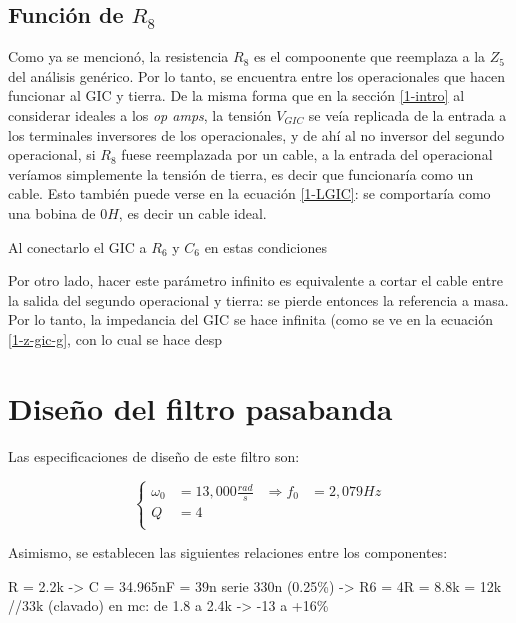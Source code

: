 \documentclass[../../tc_tp3_main.tex]{subfiles}
\begin{document}
\subsection{Funci\'on de $R_8$}

Como ya se mencion\'o, la resistencia $R_8$ es el compoonente que reemplaza a la $Z_5$ del an\'alisis gen\'erico. Por lo tanto, se encuentra entre los operacionales que hacen funcionar al GIC y tierra. De la misma forma que en la secci\'on \ref{1-intro} al considerar ideales a los \textit{op amps}, la tensi\'on $V_{GIC}$ se ve\'ia replicada de la entrada a los terminales inversores de los operacionales, y de ah\'i al no inversor del segundo operacional, si $R_8$ fuese reemplazada por un cable, a la entrada del operacional ver\'iamos simplemente la tensi\'on de tierra, es decir que funcionar\'ia como un cable. Esto tambi\'en puede verse en la ecuaci\'on \ref{1-LGIC}: se comportar\'ia como una bobina de $0H$, es decir un cable ideal.\par

Al conectarlo el GIC a $R_6$ y $C_6$ en estas condiciones

Por otro lado, hacer este  par\'ametro infinito es equivalente a cortar el cable entre la salida del segundo operacional y tierra: se pierde entonces la referencia a masa. Por lo tanto, la impedancia del GIC se hace infinita (como se ve en la ecuaci\'on \ref{1-z-gic-g}, con lo cual se hace desp




\section{Dise\~no del filtro pasabanda}

Las especificaciones de dise\~no de este filtro son:


\begin{equation}
	\left\{
		\begin{aligned}
			\omega_0 &= 13,000\frac{rad}{s} & \Rightarrow f_0 &= 2,079Hz \\
			Q &= 4 \\ 
		\end{aligned}
	\right.
 \end{equation}

Asimismo, se establecen las siguientes relaciones entre los componentes:



R = 2.2k 	-> C = 34.965nF = 39n serie 330n (0.25\%)
		-> R6 = 4R = 8.8k = 12k //33k (clavado)
en mc: de 1.8 a 2.4k -> -13  a +16\%
\end{document}

